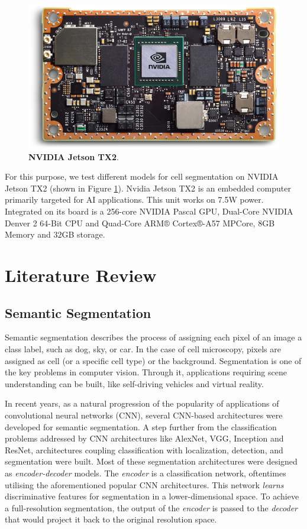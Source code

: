 \documentclass[10pt, journal, compsoc]{IEEEtran}
\begin{document}
\begin{figure}
\includegraphics[width=\linewidth]{jetson.png}
\caption{\textbf{NVIDIA Jetson TX2}.}
\label{fig:jetson}
\end{figure}
For this purpose, we test different models for cell segmentation on NVIDIA Jetson TX2 \cite{jetson} (shown in Figure \ref{fig:jetson}). Nvidia Jetson TX2 is an embedded computer primarily targeted for AI applications. This unit works on 7.5W power. Integrated on its board is a 256-core NVIDIA Pascal GPU, Dual-Core NVIDIA Denver 2 64-Bit CPU and Quad-Core ARM® Cortex®-A57 MPCore, 8GB Memory and 32GB storage.
\section{Literature Review}
\subsection{Semantic Segmentation}
Semantic segmentation describes the process of assigning each pixel of an image a class label, such as dog, sky, or car. In the case of cell microscopy, pixels are assigned as cell (or a specific cell type) or the background. Segmentation is one of the key problems in computer vision. Through it, applications requiring scene understanding can be built, like self-driving vehicles and virtual reality. 

In recent years, as a natural progression of the popularity of applications of convolutional neural networks (CNN), several CNN-based architectures were developed for semantic segmentation. A step further from the classification problems addressed by CNN architectures like AlexNet, VGG, Inception and ResNet, architectures coupling classification with localization, detection, and segmentation were built. Most of these segmentation architectures were designed as \textit{encoder-decoder} models. The \textit{encoder} is a classification network, oftentimes utilising the aforementioned popular CNN architectures. This network \textit{learns} discriminative features for segmentation in a lower-dimensional space. To achieve a full-resolution segmentation, the output of the \textit{encoder} is passed to the \textit{decoder} that would project it back to the original resolution space.
\end{document}
